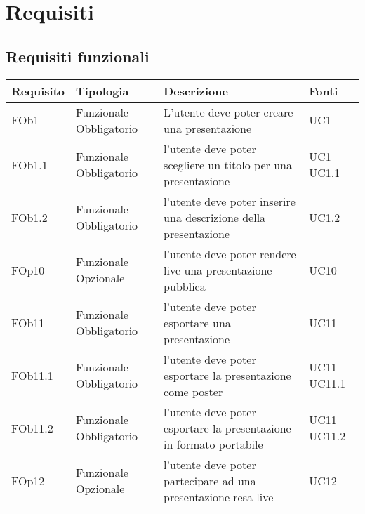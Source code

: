 \section{Requisiti}
\subsection{ Requisiti funzionali}
	
\begin{longtable}{|l|p{2.5cm}|p{5cm}|p{3.5cm}|}
\hline
\textbf{Requisito} & \textbf{Tipologia} & \textbf{Descrizione} & \textbf{Fonti} \\
\hline
FOb1 & Funzionale \linebreak Obbligatorio & L'utente deve poter creare una presentazione & UC1 \linebreak \\
\hline
FOb1.1 & Funzionale \linebreak Obbligatorio & l'utente deve poter scegliere un titolo per una presentazione & UC1 \linebreak  UC1.1 \linebreak  \\
\hline
FOb1.2 & Funzionale \linebreak Obbligatorio & l'utente deve poter inserire una descrizione della presentazione & UC1.2 \linebreak  \\
\hline
FOp10 & Funzionale \linebreak Opzionale & l'utente deve poter rendere live una presentazione pubblica & UC10 \linebreak \\
\hline
FOb11 & Funzionale \linebreak Obbligatorio & l'utente deve poter esportare una presentazione & UC11 \linebreak \\
\hline
FOb11.1 & Funzionale \linebreak Obbligatorio & l'utente deve poter esportare la presentazione come poster & UC11 \linebreak  UC11.1 \linebreak  \\
\hline
FOb11.2 & Funzionale \linebreak Obbligatorio & l'utente deve poter esportare la presentazione in formato portabile & UC11 \linebreak  UC11.2 \linebreak  \\
\hline
FOp12 & Funzionale \linebreak Opzionale & l'utente deve poter partecipare ad una presentazione resa live & UC12 \linebreak \\

\end{longtable}
